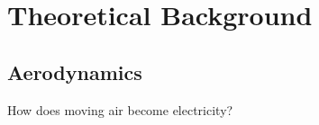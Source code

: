 \section{Theoretical Background} \label{sec:theory}


\subsection{Aerodynamics}
How does moving air become electricity?